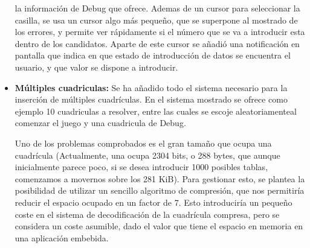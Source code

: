 \documentclass[12pt,letterpaper]{article}
\begin{document}
\begin{itemize}
    la información de Debug que ofrece. Ademas de un cursor para
    seleccionar la casilla, se usa un cursor algo más pequeño, que se
    superpone al mostrado de los errores, y permite ver rápidamente si
    el número que se va a introducir esta dentro de los candidatos.
    Aparte de este cursor se añadió una notificación en pantalla que
    indica en que estado de introducción de datos se encuentra el
    usuario, y que valor se dispone a introducir.
  \item \textbf{Múltiples cuadriculas:} Se ha añadido todo el sistema
    necesario para la inserción de múltiples cuadrículas. En el
    sistema mostrado se ofrece como ejemplo 10 cuadriculas a resolver,
    entre las cuales se escoje aleatoriamente\footnotemark al comenzar
    el juego y una cuadricula de Debug. 


    Uno de los problemas comprobados es el gran tamaño que ocupa una
    cuadrícula (Actualmente, una ocupa 2304 bits, o 288 bytes, que
    aunque inicialmente parece poco, si se desea introducir 1000
    posibles tablas, comenzamos a movernos sobre los 281 KiB). Para
    gestionar esto, se plantea la posibilidad de utilizar un sencillo
    algoritmo de compresión, que nos permitiría reducir el espacio
    ocupado en un factor de 7\footnotemark. Esto introduciría un
    pequeño coste en el sistema de decodificación de la cuadrícula
    compresa, pero se considera un coste asumible, dado el valor que
    tiene el espacio en memoria en una aplicación embebida.

    

\end{itemize}
\end{document}
